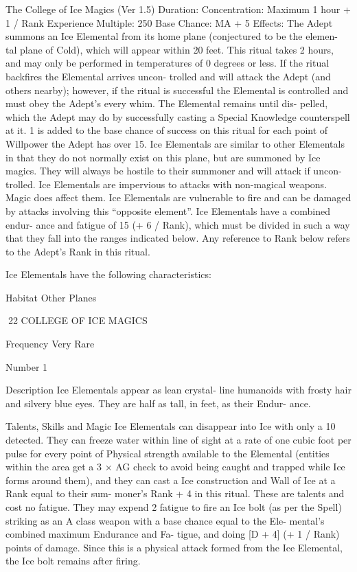 \begin{Chapter}{The College of Ice Magics (Ver 1.5)}
Duration:  Concentration:  Maximum  1  hour  +  1  / 
Rank 
Experience Multiple: 250 
Base Chance: MA + 5%
Effects:  The  Adept  summons  an  Ice  Elemental 
from its home plane (conjectured to be the elemen-
tal  plane  of  Cold),  which  will  appear  within  20 
feet.  This  ritual  takes  2  hours,  and  may  only  be 
performed  in  temperatures  of  0  degrees  or  less.  If 
the  ritual  backfires  the  Elemental  arrives  uncon-
trolled  and  will  attack  the  Adept  (and  others 
nearby);  however,  if  the  ritual  is  successful  the 
Elemental is controlled and must obey the Adept’s 
every  whim.  The  Elemental  remains  until  dis-
pelled,  which  the  Adept  may  do  by  successfully 
casting a Special Knowledge counterspell at it. 1%
is added to the base chance of success on this ritual 
for each point of Willpower the Adept has over 15. 
Ice  Elementals  are  similar  to  other  Elementals  in 
that  they  do  not  normally  exist  on  this  plane,  but 
are summoned by Ice magics. They will always be 
hostile to their summoner and will attack if uncon-
trolled.  Ice  Elementals  are  impervious  to  attacks 
with  non-magical  weapons.  Magic  does  affect 
them. Ice Elementals are vulnerable to fire and can 
be  damaged  by  attacks  involving  this  “opposite 
element”.  Ice  Elementals  have  a  combined  endur-
ance and fatigue of 15 (+ 6 / Rank), which must be 
divided in such a way that they fall into the ranges 
indicated  below.  Any  reference  to  Rank  below 
refers to the Adept’s Rank in this ritual. 

Ice Elementals have the following characteristics: 

Habitat Other Planes  

22 COLLEGE OF ICE MAGICS 

Frequency Very Rare  

Number 1 

Description Ice Elementals appear as lean crystal-
line  humanoids  with  frosty  hair  and  silvery  blue 
eyes.  They  are  half  as  tall,  in  feet,  as  their  Endur-
ance. 

Talents,  Skills  and  Magic  Ice  Elementals  can 
disappear into Ice with only a 10%
detected. They can freeze water within line of sight 
at a rate of one cubic foot per pulse for every point 
of  Physical  strength  available  to  the  Elemental 
(entities  within  the  area  get  a  3  ×  AG  check  to 
avoid  being  caught  and  trapped  while  Ice  forms 
around them), and they can cast a  Ice construction 
and  Wall  of  Ice  at  a  Rank  equal  to  their  sum-
moner’s  Rank  +  4  in  this  ritual.  These  are  talents 
and cost no fatigue. They may expend 2 fatigue to 
fire  an  Ice  bolt  (as  per  the  Spell)  striking  as  an  A 
class weapon with a base chance equal to the Ele-
mental’s  combined  maximum  Endurance  and  Fa-
tigue,  and  doing  [D  +  4]  (+  1  /  Rank)  points  of 
damage.  Since  this  is  a  physical  attack  formed 
from  the  Ice  Elemental,  the  Ice  bolt  remains  after 
firing. 


\end{Chapter}
